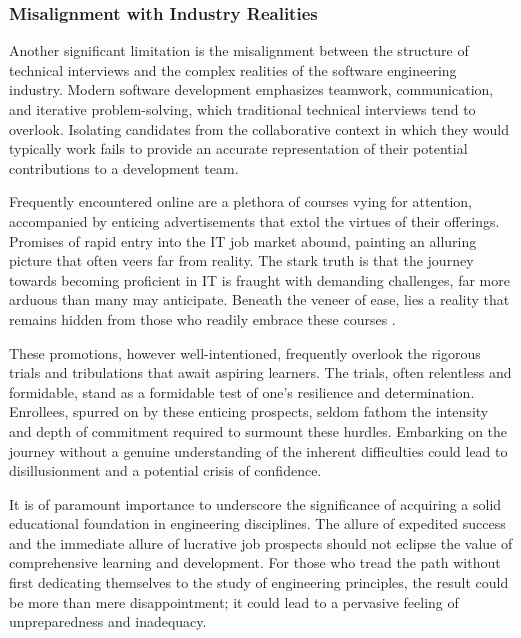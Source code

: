 \documentclass[
    a4paper, %
    10pt, %
    unnumberedsections, %
    twoside, %
]{LTJournalArticle}
\begin{document}
\subsubsection*{Misalignment with Industry Realities}

Another significant limitation is the misalignment between the structure of technical interviews and the complex realities of the software engineering industry. Modern software development emphasizes teamwork, communication, and iterative problem-solving, which traditional technical interviews tend to overlook. Isolating candidates from the collaborative context in which they would typically work fails to provide an accurate representation of their potential contributions to a development team.


Frequently encountered online are a plethora of courses vying for attention, accompanied by enticing advertisements that extol the virtues of their offerings. Promises of rapid entry into the IT job market abound, painting an alluring picture that often veers far from reality. The stark truth is that the journey towards becoming proficient in IT is fraught with demanding challenges, far more arduous than many may anticipate. Beneath the veneer of ease, lies a reality that remains hidden from those who readily embrace these courses \cite{dweck2006mindset,duckworth2016grit}.

These promotions, however well-intentioned, frequently overlook the rigorous trials and tribulations that await aspiring learners. The trials, often relentless and formidable, stand as a formidable test of one’s resilience and determination. Enrollees, spurred on by these enticing prospects, seldom fathom the intensity and depth of commitment required to surmount these hurdles. Embarking on the journey without a genuine understanding of the inherent difficulties could lead to disillusionment and a potential crisis of confidence.

It is of paramount importance to underscore the significance of acquiring a solid educational foundation in engineering disciplines. The allure of expedited success and the immediate allure of lucrative job prospects should not eclipse the value of comprehensive learning and development. For those who tread the path without first dedicating themselves to the study of engineering principles, the result could be more than mere disappointment; it could lead to a pervasive feeling of unpreparedness and inadequacy.
\end{document}
